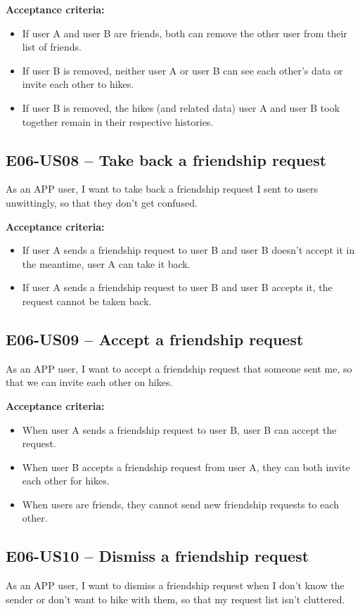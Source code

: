 \textbf{Acceptance criteria:}
\begin{itemize}
    \item If user A and user B are friends, both can remove the other user from their list of friends.
    \item If user B is removed, neither user A or user B can see each other's data or invite each other to hikes.
    \item If user B is removed, the hikes (and related data) user A and user B took together remain in their respective histories.
\end{itemize}

\subsection*{E06-US08 -- Take back a friendship request}
As an APP user, I want to take back a friendship request I sent to users unwittingly, so that they don't get confused.

\textbf{Acceptance criteria:}
\begin{itemize}
    \item If user A sends a friendship request to user B and user B doesn't accept it in the meantime, user A can take it back.
    \item If user A sends a friendship request to user B and user B accepts it, the request cannot be taken back.
\end{itemize}

\subsection*{E06-US09 -- Accept a friendship request}
As an APP user, I want to accept a friendship request that someone sent me, so that we can invite each other on hikes.

\textbf{Acceptance criteria:}
\begin{itemize}
    \item When user A sends a friendship request to user B, user B can accept the request.
    \item When user B accepts a friendship request from user A, they can both invite each other for hikes.
    \item When users are friends, they cannot send new friendship requests to each other.
\end{itemize}


\subsection*{E06-US10 -- Dismiss a friendship request}
As an APP user, I want to dismiss a friendship request when I don't know the sender or don't want to hike with them, so that my request list isn't cluttered.

